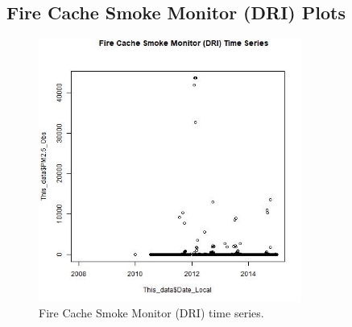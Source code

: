 
\subsection{Fire Cache Smoke Monitor (DRI) Plots}
\begin{figure} 
\centering 
\includegraphics[width=0.77\textwidth]{Code_Outputs/FireCacheDRI_time_series.jpg} 
\caption{\label{fig:FireCacheDRITS}Fire Cache Smoke Monitor (DRI) time series.} 
\end{figure} 
 
